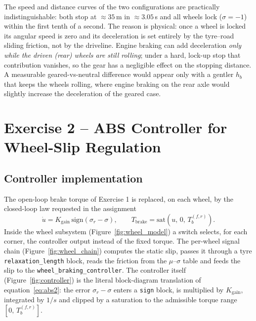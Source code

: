 The speed and distance curves of the two configurations are practically
indistinguishable: both stop at $\approx35$\,m in $\approx3.05$\,s and
all wheels lock ($\sigma=-1$) within the first tenth of a second. The
reason is physical: once a wheel is locked its angular speed is zero and
its deceleration is set entirely by the tyre--road sliding friction,
not by the driveline. Engine braking can add deceleration \emph{only
while the driven (rear) wheels are still rolling}; under a hard,
lock-up stop that contribution vanishes, so the gear has a negligible
effect on the stopping distance. A measurable geared-vs-neutral
difference would appear only with a gentler $h_b$ that keeps the wheels
rolling, where engine braking on the rear axle would slightly increase
the deceleration of the geared case.

\section{Exercise 2 -- ABS Controller for Wheel-Slip Regulation}

\subsection*{Controller implementation}
The open-loop brake torque of Exercise 1 is replaced, on each wheel, by
the closed-loop law requested in the assignment
\begin{equation}
    \dot u = K_\mathrm{gain}\,\mathrm{sign}(\sigma_r-\sigma), \qquad
    T_\mathrm{brake} = \mathrm{sat}\!\left(u,\,0,\,T_b^{(f,r)}\right).
    \label{eq:abs2}
\end{equation}
Inside the wheel subsystem (Figure~\ref{fig:wheel_model}) a switch
selects, for each corner, the controller output instead of the fixed
torque. The per-wheel signal chain (Figure~\ref{fig:wheel_chain})
computes the static slip, passes it through a tyre
\texttt{relaxation\_length} block, reads the friction from the
$\mu$--$\sigma$ table and feeds the slip to the
\texttt{wheel\_braking\_controller}. The controller itself
(Figure~\ref{fig:controller}) is the literal block-diagram translation
of equation~\eqref{eq:abs2}: the error $\sigma_r-\sigma$ enters a
\texttt{sign} block, is multiplied by $K_\mathrm{gain}$, integrated by
$1/s$ and clipped by a saturation to the admissible torque range
$[0,\,T_b^{(f,r)}]$.

